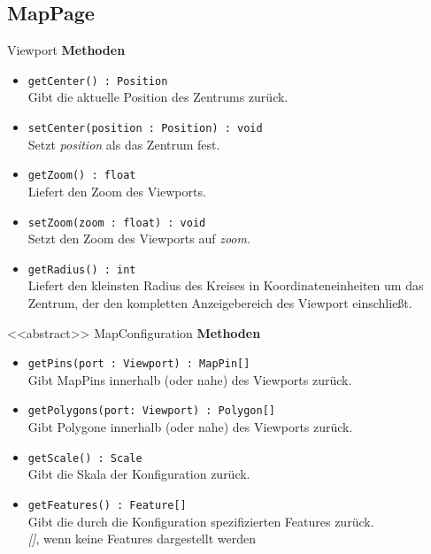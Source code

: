 \subsection{MapPage}

    \begin{Class}{Viewport}
        \textbf{Methoden}
        \begin{itemize}
            \item \texttt{getCenter() : Position}
            \\ Gibt die aktuelle Position des Zentrums zurück.
            \item \texttt{setCenter(position : Position) : void}
            \\ Setzt \emph{position} als das Zentrum fest.
            \item \texttt{getZoom() : float}
            \\ Liefert den Zoom des Viewports.
            \item \texttt{setZoom(zoom : float) : void}
            \\ Setzt den Zoom des Viewports auf \emph{zoom}.
            \item \texttt{getRadius() : int}
            \\ Liefert den kleinsten Radius des Kreises in Koordinateneinheiten um das Zentrum,
            der den kompletten Anzeigebereich des Viewport einschließt.
        \end{itemize}
    \end{Class}

    \begin{Class}{<<abstract>> MapConfiguration}
        \textbf{Methoden}
        \begin{itemize}
            \item \texttt{getPins(port : Viewport) : MapPin[]}
            \\ Gibt MapPins innerhalb (oder nahe) des Viewports zurück.
            \item \texttt{getPolygons(port: Viewport) : Polygon[]}
            \\ Gibt Polygone innerhalb (oder nahe) des Viewports zurück.
            \item \texttt{getScale() : Scale}
            \\ Gibt die Skala der Konfiguration zurück.
            \item \texttt{getFeatures() : Feature[]}
            \\ Gibt die durch die Konfiguration spezifizierten Features zurück.
            \\ \emph{[]}, wenn keine Features dargestellt werden
        \end{itemize}
    \end{Class}

